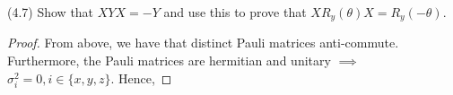 \documentclass[main.tex]{subfiles}
\begin{document}
\begin{subappendices}

%	
%
%

\begin{exercise} (4.7) Show that $XY X = −Y$ and use this to prove that $XR_y(\theta)X = R_y(-\theta)$.

\begin{proof}
	From above, we have that distinct Pauli matrices anti-commute. Furthermore, the Pauli matrices are hermitian and unitary $\implies$ $\sigma_i^2 = 0, i \in \{x, y, z \}$. Hence, 
	

\end{proof}
\end{exercise}
\end{subappendices}
\end{document}
